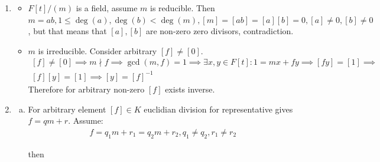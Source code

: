 \documentclass[12pt]{article}
\begin{document}
\begin{enumerate}
\begin{enumerate}[a)]
\begin{itemize}
                        Since number of factors is finite this process repeats until no more factors left on left or right side of the equality.

                  \item Assume $r \neq s$, for example $r < s$ then after this process ends we get
                        \[
                        1=\rho_k \cdots \rho_s
                        \]

                        Whicl is impossible because $\deg(1) = 0, \deg(\rho_k \cdots \rho_s) \geq 1$.

                        Similarly for $r > s$. Contradiction.
                \end{itemize}
        \end{enumerate}
  \item
        \begin{itemize}
          \item $F[t]/(m)$ is a field, assume $m$ is reducible. Then $m=ab, 1 \leq \deg(a), \deg(b) < \deg(m), [m]=[ab]=[a][b]=0, [a] \neq 0, [b] \neq 0$, but that means that $[a], [b]$ are non-zero zero divisors, contradiction.
          \item $m$ is irreducible. Consider arbitrary $[f] \neq [0]$.
                \[
                \begin{gathered}
                [f] \neq [0] \implies m \nmid f \implies \gcd(m, f) = 1 \implies \exists x, y \in F[t] \colon 1 = mx + fy \implies [fy] = [1] \implies \\
                [f][y] = [1] \implies [y] = {[f]}^{-1}
                \end{gathered}
                \]
                Therefore for arbitrary non-zero $[f]$ exists inverse.
        \end{itemize}
  \item
        \begin{enumerate}[a)]
          \item For arbitrary element $[f] \in K$ euclidian division for representative gives $f = qm + r$. Assume:
                \[
                \begin{gathered}
                  f=q_1m + r_1=q_2m + r_2, q_1\neq q_2, r_1 \neq r_2
                \end{gathered}
                \]

                then


\end{enumerate}
\end{enumerate}
\end{document}
